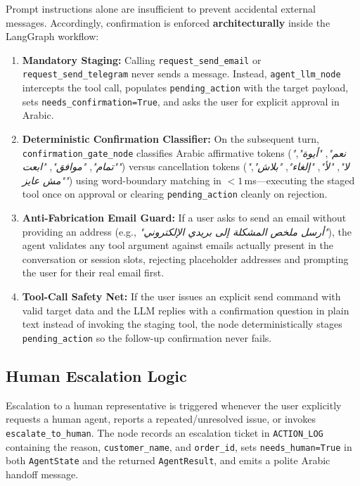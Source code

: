 Prompt instructions alone are insufficient to prevent accidental external messages. Accordingly, confirmation is enforced \textbf{architecturally} inside the LangGraph workflow:
\begin{enumerate}
    \item \textbf{Mandatory Staging:} Calling \texttt{request\_send\_email} or \texttt{request\_send\_telegram} never sends a message. Instead, \texttt{agent\_llm\_node} intercepts the tool call, populates \texttt{pending\_action} with the target payload, sets \texttt{needs\_confirmation=True}, and asks the user for explicit approval in Arabic.
    \item \textbf{Deterministic Confirmation Classifier:} On the subsequent turn, \texttt{confirmation\_gate\_node} classifies Arabic affirmative tokens (\textit{"نعم"}, \textit{"أيوة"}, \textit{"تمام"}, \textit{"موافق"}, \textit{"ابعت"}) versus cancellation tokens (\textit{"لا"}, \textit{"لأ"}, \textit{"إلغاء"}, \textit{"بلاش"}, \textit{"مش عايز"}) using word-boundary matching in $< 1$\,ms—executing the staged tool once on approval or clearing \texttt{pending\_action} cleanly on rejection.
    \item \textbf{Anti-Fabrication Email Guard:} If a user asks to send an email without providing an address (e.g., \textit{"أرسل ملخص المشكلة إلى بريدي الإلكتروني"}), the agent validates any tool argument against emails actually present in the conversation or session slots, rejecting placeholder addresses and prompting the user for their real email first.
    \item \textbf{Tool-Call Safety Net:} If the user issues an explicit send command with valid target data and the LLM replies with a confirmation question in plain text instead of invoking the staging tool, the node deterministically stages \texttt{pending\_action} so the follow-up confirmation never fails.
\end{enumerate}

\subsection{Human Escalation Logic}
\label{subsec:human_escalation}

Escalation to a human representative is triggered whenever the user explicitly requests a human agent, reports a repeated/unresolved issue, or invokes \texttt{escalate\_to\_human}. The node records an escalation ticket in \texttt{ACTION\_LOG} containing the reason, \texttt{customer\_name}, and \texttt{order\_id}, sets \texttt{needs\_human=True} in both \texttt{AgentState} and the returned \texttt{AgentResult}, and emits a polite Arabic handoff message.

